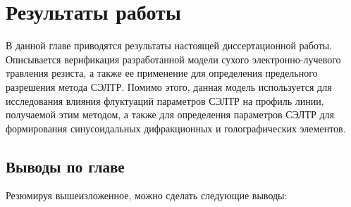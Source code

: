 \chapter{Результаты работы}

В данной главе приводятся результаты настоящей диссертационной работы. Описывается верификация разработанной модели сухого электронно-лучевого травления резиста, а также ее применение для определения предельного разрешения метода СЭЛТР. Помимо этого, данная модель используется для исследования влияния флуктуаций параметров СЭЛТР на профиль линии, получаемой этим методом, а также для определения параметров СЭЛТР для формирования синусоидальных дифракционных и голографических элементов.








\newpage

\section{Выводы по главе}
Резюмируя вышеизложенное, можно сделать следующие выводы:

